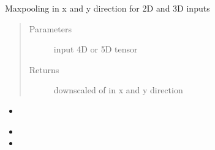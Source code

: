 \documentclass[letterpaper,10pt,english]{sphinxmanual}
\begin{document}
\begin{fulllineitems}
\label{\detokenize{index:unet.ops.MaxPoolingND}}
Maxpooling in x and y direction for 2D and 3D inputs
\begin{quote}\begin{description}
\item[{Parameters}] \leavevmode
{} \textendash{} input 4D or 5D tensor

\item[{Returns}] \leavevmode
downscaled of  in x and y direction

\end{description}\end{quote}



\begin{itemize}
\item {} 
{\hyperref[\detokenize{index:unet.ops.up_conv}]{}}

\item {} 

\item {} 

\end{itemize}



\end{fulllineitems}

\end{document}

